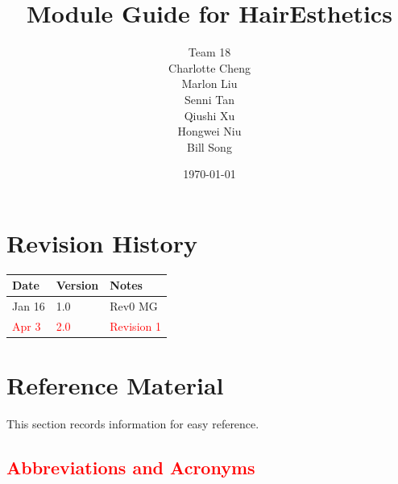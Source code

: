 \documentclass[12pt, titlepage]{article}
\begin{document}
\title{Module Guide for HairEsthetics}

\author{Team 18 \\ Charlotte Cheng
        \\ Marlon Liu
        \\ Senni Tan
        \\ Qiushi Xu
        \\ Hongwei Niu
        \\ Bill Song
}
\date{\today}

\maketitle


\section{Revision History}

\begin{tabularx}{\textwidth}{p{3cm}p{2cm}X}
\toprule {\bf Date} & {\bf Version} & {\bf Notes}\\
\midrule
Jan 16 & 1.0 & Rev0 MG\\
\textcolor{red}{Apr 3} & \textcolor{red}{2.0} & \textcolor{red}{Revision 1}\\
\bottomrule
\end{tabularx}

\newpage

\section{Reference Material}

This section records information for easy reference.

\subsection{\textcolor{red}{Abbreviations and Acronyms}}
\end{document}
